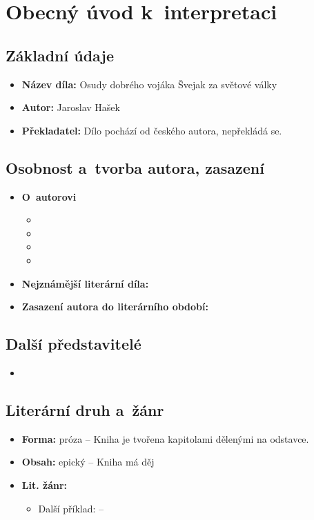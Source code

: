 \section{Obecný úvod k~interpretaci}

\subsection{Základní údaje}
\begin{itemize}
    \item \textbf{Název díla:} Osudy dobrého vojáka Švejak za světové války
    \item \textbf{Autor:} Jaroslav Hašek
    \item \textbf{Překladatel:} Dílo pochází od českého autora, nepřekládá se.
\end{itemize}

\subsection{Osobnost a~tvorba autora, zasazení}
\begin{itemize}
    \item \textbf{O~autorovi}
    \begin{itemize}
        \item
        \item
        \item
        \item
    \end{itemize}
    \item \textbf{Nejznámější literární díla:}
    \item \textbf{Zasazení autora do literárního období:}
\end{itemize}

\subsection{Další představitelé}
\begin{itemize}
	\item \textbf{}
\end{itemize}

\subsection{Literární druh a~žánr}
\begin{itemize}
    \item \textbf{Forma:} próza -- Kniha je tvořena kapitolami dělenými na odstavce.
    \item \textbf{Obsah:} epický -- Kniha má děj
    \item \textbf{Lit. žánr:}
    \begin{itemize}
        \item Další příklad: \textit{} --
    \end{itemize}
\end{itemize}

\newpage
